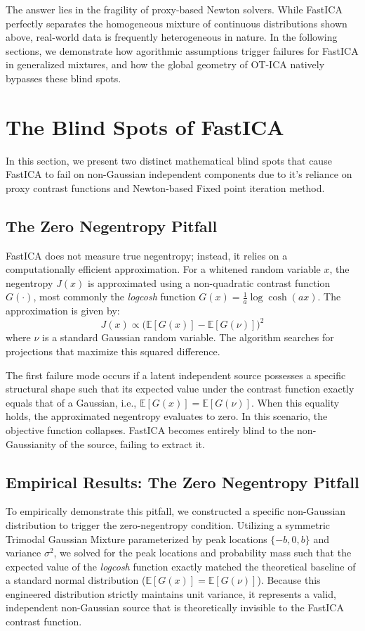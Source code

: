 \documentclass[12pt,a4paper,twoside,openany]{book}
\begin{document}
The answer lies in the fragility of proxy-based Newton solvers. While FastICA perfectly separates the homogeneous mixture of continuous distributions shown above, 
real-world data is frequently heterogeneous in nature. In the following sections, we demonstrate how agorithmic assumptions trigger failures for FastICA in generalized mixtures, 
and how the global geometry of OT-ICA natively bypasses these blind spots.

\section{The Blind Spots of FastICA}
In this section, we present two distinct mathematical blind spots that cause FastICA to fail on non-Gaussian independent components due to 
it's reliance on proxy contrast functions and Newton-based Fixed point iteration method.

\subsection{The Zero Negentropy Pitfall}
FastICA does not measure true negentropy; instead, it relies on a computationally efficient approximation. For a whitened random variable $x$, 
the negentropy $J(x)$ is approximated using a non-quadratic contrast function $G(\cdot)$, most commonly the \textit{logcosh} function $G(x) = \frac{1}{a} \log \cosh(ax)$. 
The approximation is given by:
\begin{equation}
    J(x) \propto \big( \mathbb{E}[G(x)] - \mathbb{E}[G(\nu)] \big)^2
\end{equation}
where $\nu$ is a standard Gaussian random variable. The algorithm searches for projections that maximize this squared difference. 

The first failure mode occurs if a latent independent source possesses a specific structural shape such that its expected value under the 
contrast function exactly equals that of a Gaussian, i.e., $\mathbb{E}[G(x)] = \mathbb{E}[G(\nu)]$. When this equality holds, 
the approximated negentropy evaluates to zero. In this scenario, the objective function collapses. 
FastICA becomes entirely blind to the non-Gaussianity of the source, failing to extract it.

\subsection{Empirical Results: The Zero Negentropy Pitfall}
To empirically demonstrate this pitfall, we constructed a specific non-Gaussian distribution to trigger 
the zero-negentropy condition. Utilizing a symmetric Trimodal Gaussian Mixture parameterized by peak locations $\{-b, 0, b\}$ and 
variance $\sigma^2$, we solved for the peak locations and probability mass such that the expected value of 
the \textit{logcosh} function exactly matched the theoretical baseline of a standard normal distribution ($\mathbb{E}[G(x)] = \mathbb{E}[G(\nu)]$). 
Because this engineered distribution strictly maintains unit variance, it represents a valid, independent non-Gaussian source 
that is theoretically invisible to the FastICA contrast function.
\end{document}
